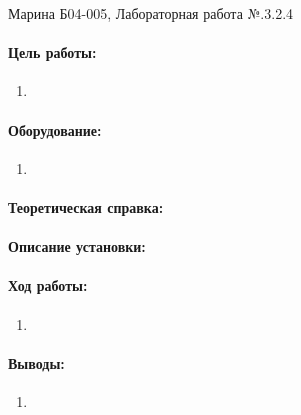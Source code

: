 \documentclass[a4paper,12pt]{article}
\author{Бичина Марина 
группа Б04-005 1 курса ФЭФМ}
\title{}
\date{}
\begin{document}

\begin{center}
\begin{Large}
{ Марина Б04-005, Лабораторная работа №.3.2.4}
\end{Large}
\end{center}
\paragraph{Цель работы:} 

\begin{enumerate}
\itemsep0em
\item 
\end{enumerate}
\paragraph{Оборудование:}
\begin{enumerate}
\itemsep0em
\item 
\end{enumerate}


\paragraph{Теоретическая справка:}
\paragraph{}



\paragraph{}

\paragraph{Описание установки:}
\paragraph{}
\paragraph{Ход работы:}
\begin{enumerate}
\itemsep0em
\item 
\end{enumerate}
\paragraph{Выводы:}
\begin{enumerate}
\item
\end{enumerate}
\end{document}
